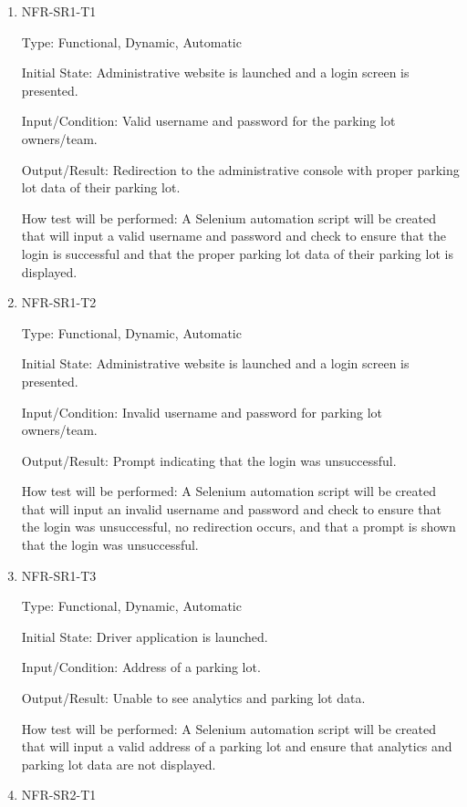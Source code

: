 \documentclass[12pt, titlepage]{article}
\begin{document}
\begin{enumerate}
\item{NFR-SR1-T1}

Type: Functional, Dynamic, Automatic
					
Initial State: Administrative website is launched and a login screen is
presented.
					
Input/Condition: Valid username and password for the parking lot owners/team.
					
Output/Result: Redirection to the administrative console with proper parking lot
data of their parking lot.
					
How test will be performed: A Selenium automation script will be created that
will input a valid username and password and check to ensure that the login is
successful and that the proper parking lot data of their parking lot is
displayed.

\item{NFR-SR1-T2}

Type: Functional, Dynamic, Automatic
					
Initial State: Administrative website is launched and a login screen is
presented.
					
Input/Condition: Invalid username and password for parking lot owners/team.
					
Output/Result: Prompt indicating that the login was unsuccessful.
					
How test will be performed: A Selenium automation script will be created that
will input an invalid username and password and check to ensure that the login
was unsuccessful, no redirection occurs, and that a prompt is shown that the
login was unsuccessful.

\item{NFR-SR1-T3}

Type: Functional, Dynamic, Automatic
					
Initial State: Driver application is launched.
					
Input/Condition: Address of a parking lot.
					
Output/Result: Unable to see analytics and parking lot data.
					
How test will be performed: A Selenium automation script will be created that
will input a valid address of a parking lot and ensure that analytics and
parking lot data are not displayed.

\item{NFR-SR2-T1}


\end{enumerate}
\end{document}
